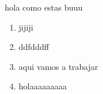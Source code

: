 \documentclass[12pt]{article}
\begin{document}
hola como estas buuu
\begin{enumerate}
    \item jijiji
    \item ddfdddff
    \item aqui vamos a trabajar 
    \item holaaaaaaaaa
    
\end{enumerate}
\end{document}

